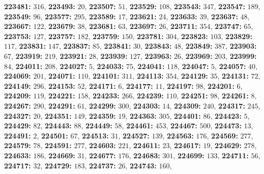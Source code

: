 \textsf{\bfseries 223481:} $316$, \textsf{\bfseries 223493:} $20$, \textsf{\bfseries 223507:} $51$, \textsf{\bfseries 223529:} $108$, \textsf{\bfseries 223543:} $347$, \textsf{\bfseries 223547:} $189$, \textsf{\bfseries 223549:} $96$, \textsf{\bfseries 223577:} $295$, \textsf{\bfseries 223589:} $17$, \textsf{\bfseries 223621:} $24$, \textsf{\bfseries 223633:} $39$, \textsf{\bfseries 223637:} $48$, \textsf{\bfseries 223667:} $122$, \textsf{\bfseries 223679:} $38$, \textsf{\bfseries 223681:} $63$, \textsf{\bfseries 223697:} $26$, \textsf{\bfseries 223711:} $354$, \textsf{\bfseries 223747:} $65$, \textsf{\bfseries 223753:} $127$, \textsf{\bfseries 223757:} $182$, \textsf{\bfseries 223759:} $150$, \textsf{\bfseries 223781:} $304$, \textsf{\bfseries 223823:} $103$, \textsf{\bfseries 223829:} $117$, \textsf{\bfseries 223831:} $147$, \textsf{\bfseries 223837:} $85$, \textsf{\bfseries 223841:} $30$, \textsf{\bfseries 223843:} $48$, \textsf{\bfseries 223849:} $387$, \textsf{\bfseries 223903:} $67$, \textsf{\bfseries 223919:} $219$, \textsf{\bfseries 223921:} $28$, \textsf{\bfseries 223939:} $127$, \textsf{\bfseries 223963:} $26$, \textsf{\bfseries 223969:} $203$, \textsf{\bfseries 223999:} $84$, \textsf{\bfseries 224011:} $208$, \textsf{\bfseries 224027:} $5$, \textsf{\bfseries 224033:} $75$, \textsf{\bfseries 224041:} $118$, \textsf{\bfseries 224047:} $5$, \textsf{\bfseries 224057:} $40$, \textsf{\bfseries 224069:} $201$, \textsf{\bfseries 224071:} $110$, \textsf{\bfseries 224101:} $311$, \textsf{\bfseries 224113:} $354$, \textsf{\bfseries 224129:} $35$, \textsf{\bfseries 224131:} $72$, \textsf{\bfseries 224149:} $296$, \textsf{\bfseries 224153:} $52$, \textsf{\bfseries 224171:} $6$, \textsf{\bfseries 224177:} $11$, \textsf{\bfseries 224197:} $98$, \textsf{\bfseries 224201:} $6$, \textsf{\bfseries 224209:} $119$, \textsf{\bfseries 224221:} $158$, \textsf{\bfseries 224233:} $266$, \textsf{\bfseries 224239:} $110$, \textsf{\bfseries 224251:} $98$, \textsf{\bfseries 224261:} $8$, \textsf{\bfseries 224267:} $290$, \textsf{\bfseries 224291:} $61$, \textsf{\bfseries 224299:} $300$, \textsf{\bfseries 224303:} $14$, \textsf{\bfseries 224309:} $240$, \textsf{\bfseries 224317:} $245$, \textsf{\bfseries 224327:} $20$, \textsf{\bfseries 224351:} $149$, \textsf{\bfseries 224359:} $19$, \textsf{\bfseries 224363:} $305$, \textsf{\bfseries 224401:} $86$, \textsf{\bfseries 224423:} $5$, \textsf{\bfseries 224429:} $82$, \textsf{\bfseries 224443:} $88$, \textsf{\bfseries 224449:} $58$, \textsf{\bfseries 224461:} $453$, \textsf{\bfseries 224467:} $500$, \textsf{\bfseries 224473:} $13$, \textsf{\bfseries 224491:} $2$, \textsf{\bfseries 224501:} $67$, \textsf{\bfseries 224513:} $31$, \textsf{\bfseries 224527:} $139$, \textsf{\bfseries 224563:} $176$, \textsf{\bfseries 224569:} $277$, \textsf{\bfseries 224579:} $78$, \textsf{\bfseries 224591:} $277$, \textsf{\bfseries 224603:} $221$, \textsf{\bfseries 224611:} $23$, \textsf{\bfseries 224617:} $19$, \textsf{\bfseries 224629:} $278$, \textsf{\bfseries 224633:} $186$, \textsf{\bfseries 224669:} $31$, \textsf{\bfseries 224677:} $176$, \textsf{\bfseries 224683:} $301$, \textsf{\bfseries 224699:} $133$, \textsf{\bfseries 224711:} $56$, \textsf{\bfseries 224717:} $32$, \textsf{\bfseries 224729:} $183$, \textsf{\bfseries 224737:} $26$, \textsf{\bfseries 224743:} $160$, 
